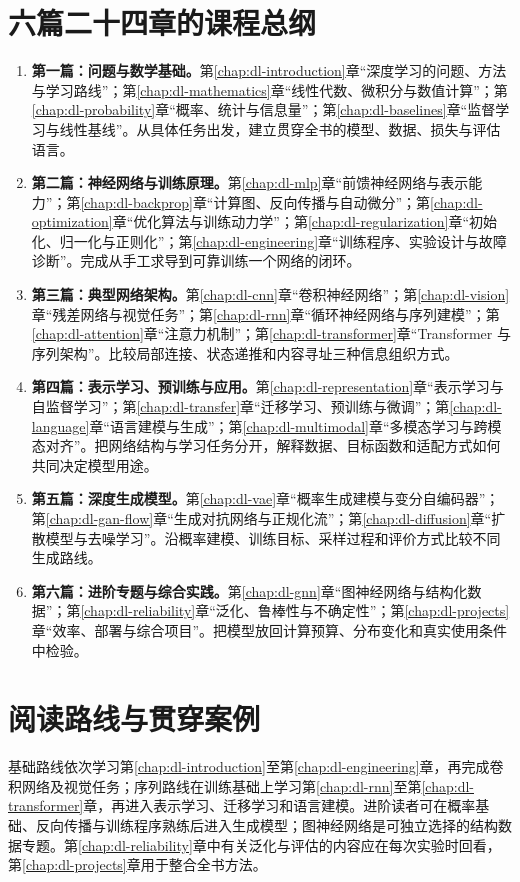 \section*{六篇二十四章的课程总纲}
\begin{enumerate}
  \item \textbf{第一篇：问题与数学基础。}第\ref{chap:dl-introduction}章“深度学习的问题、方法与学习路线”；第\ref{chap:dl-mathematics}章“线性代数、微积分与数值计算”；第\ref{chap:dl-probability}章“概率、统计与信息量”；第\ref{chap:dl-baselines}章“监督学习与线性基线”。从具体任务出发，建立贯穿全书的模型、数据、损失与评估语言。
  \item \textbf{第二篇：神经网络与训练原理。}第\ref{chap:dl-mlp}章“前馈神经网络与表示能力”；第\ref{chap:dl-backprop}章“计算图、反向传播与自动微分”；第\ref{chap:dl-optimization}章“优化算法与训练动力学”；第\ref{chap:dl-regularization}章“初始化、归一化与正则化”；第\ref{chap:dl-engineering}章“训练程序、实验设计与故障诊断”。完成从手工求导到可靠训练一个网络的闭环。
  \item \textbf{第三篇：典型网络架构。}第\ref{chap:dl-cnn}章“卷积神经网络”；第\ref{chap:dl-vision}章“残差网络与视觉任务”；第\ref{chap:dl-rnn}章“循环神经网络与序列建模”；第\ref{chap:dl-attention}章“注意力机制”；第\ref{chap:dl-transformer}章“Transformer 与序列架构”。比较局部连接、状态递推和内容寻址三种信息组织方式。
  \item \textbf{第四篇：表示学习、预训练与应用。}第\ref{chap:dl-representation}章“表示学习与自监督学习”；第\ref{chap:dl-transfer}章“迁移学习、预训练与微调”；第\ref{chap:dl-language}章“语言建模与生成”；第\ref{chap:dl-multimodal}章“多模态学习与跨模态对齐”。把网络结构与学习任务分开，解释数据、目标函数和适配方式如何共同决定模型用途。
  \item \textbf{第五篇：深度生成模型。}第\ref{chap:dl-vae}章“概率生成建模与变分自编码器”；第\ref{chap:dl-gan-flow}章“生成对抗网络与正规化流”；第\ref{chap:dl-diffusion}章“扩散模型与去噪学习”。沿概率建模、训练目标、采样过程和评价方式比较不同生成路线。
  \item \textbf{第六篇：进阶专题与综合实践。}第\ref{chap:dl-gnn}章“图神经网络与结构化数据”；第\ref{chap:dl-reliability}章“泛化、鲁棒性与不确定性”；第\ref{chap:dl-projects}章“效率、部署与综合项目”。把模型放回计算预算、分布变化和真实使用条件中检验。
\end{enumerate}

\section*{阅读路线与贯穿案例}
基础路线依次学习第\ref{chap:dl-introduction}至第\ref{chap:dl-engineering}章，再完成卷积网络及视觉任务；序列路线在训练基础上学习第\ref{chap:dl-rnn}至第\ref{chap:dl-transformer}章，再进入表示学习、迁移学习和语言建模。进阶读者可在概率基础、反向传播与训练程序熟练后进入生成模型；图神经网络是可独立选择的结构数据专题。第\ref{chap:dl-reliability}章中有关泛化与评估的内容应在每次实验时回看，第\ref{chap:dl-projects}章用于整合全书方法。

